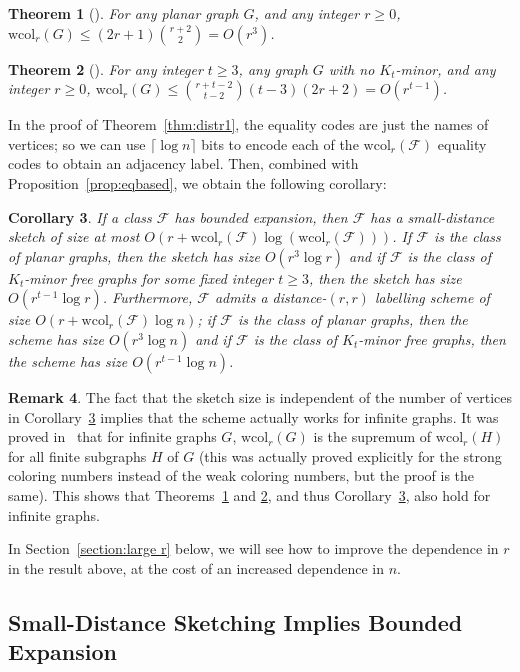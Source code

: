 \documentclass[11pt]{article}
\newtheorem{thm}{Theorem}[section]
\newtheorem{corollary}[thm]{Corollary}
\theoremstyle{definition}
\newtheorem{rem}[thm]{Remark}
\newcommand{\wcol}{\mathrm{wcol}}
\renewcommand{\le}{\leqslant}
\renewcommand{\ge}{\geqslant}
\def\F {{\mathcal F}}
\begin{document}
\begin{thm}[\cite{HOQRS17}]\label{thm:beplanar}
For any planar graph $G$, and any integer $r\ge 0$, $\wcol_r(G)\le (2r+1){r+2\choose 2}=O(r^3)$.
\end{thm}

\begin{thm}[\cite{HOQRS17}]\label{thm:beminor}
For any integer $t\ge 3$, any graph $G$ with no $K_t$-minor, and any
integer $r\ge 0$, $\wcol_r(G)\le {r+t-2\choose t-2}(t-3)(2r+2)=O(r^{t-1})$.
\end{thm}
\noindent
In the proof of Theorem~\ref{thm:distr1}, the equality codes are just the names of
vertices; so we can use $\lceil \log n \rceil$ bits to encode each of the $\wcol_r(\F)$ equality
codes to obtain an adjacency label. Then, combined with Proposition~\ref{prop:eqbased}, we obtain
the following corollary:
\begin{corollary}\label{cor:distr1}
If a class $\mathcal{F}$ has bounded expansion, then $\F$ has a small-distance sketch of size at
most $O(r + \wcol_r(\F)\log(\wcol_r(\F)))$. If $\F$ is the class of planar graphs, then the sketch
has size $O(r^3 \log r)$ and if $\F$ is the class of $K_t$-minor free graphs for some fixed integer
$t\ge 3$, then the sketch has size $O(r^{t-1}\log r)$. Furthermore, $\F$ admits a distance-$(r,r)$
labelling scheme of size $O(r + \wcol_r(\F)\log n)$; if $\F$ is the class of planar graphs, then the
scheme has size $O(r^3\log n)$ and if $\F$ is the class of $K_t$-minor free graphs, then the scheme
has  size $O(r^{t-1}\log n)$.
\end{corollary}

\begin{rem}
The fact that the sketch size is independent of the number of vertices in Corollary~\ref{cor:distr1}
implies that the scheme actually works for infinite graphs. It was proved in~\cite{HMSTW21} that for
infinite graphs $G$, $\wcol_r(G)$ is the supremum of $\wcol_r(H)$ for all finite subgraphs $H$ of
$G$ (this was actually proved explicitly for the strong coloring numbers instead of the weak
coloring numbers, but the proof is the same). This shows that Theorems~\ref{thm:beplanar} and
\ref{thm:beminor}, and thus Corollary~\ref{cor:distr1}, also hold for infinite graphs.
\end{rem}

\noindent
In Section~\ref{section:large r} below, we will see how to improve the
dependence in $r$ in the result above, at the cost of an increased dependence in $n$.


\subsection{Small-Distance Sketching Implies Bounded Expansion}
\label{section:small-distance lower bounds}
\end{document}
